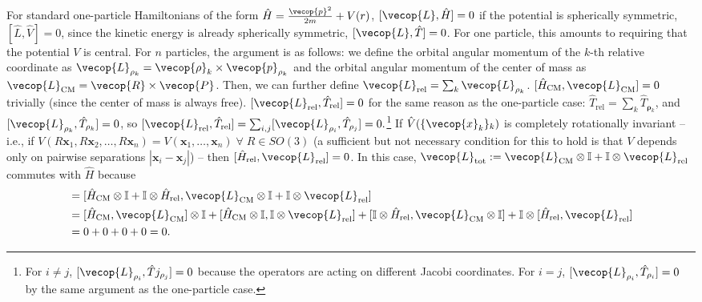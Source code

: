  For standard one-particle Hamiltonians of the form $\hat{H}=\frac{\vecop{p}^2}{2m} + V(r)$, $[\vecop{L}, \hat{H}]=0$ if the potential is spherically symmetric, $[\hat{L},\hat{V}]=0$, since the kinetic energy is already spherically symmetric, $[\vecop{L}, \hat{T}]=0$. For one particle, this amounts to requiring that the potential $V$ is central. For $n$ particles, the argument is as follows: we define the orbital angular momentum of the $k$-th relative coordinate as $\vecop{L}_{\mathbf{\rho}_k} = \vecop{\rho}_k\times \vecop{p}_{\mathbf{\rho}_k}$ and the orbital angular momentum of the center of mass as $\vecop{L}_{\text{CM}} = \vecop{R} \times \vecop{P}$. Then, we can further define $\vecop{L}_{\text{rel}}=\sum_k \vecop{L}_{\mathbf{\rho}_k}$. $[\hat{H}_{\text{CM}},\vecop{L}_{\text{CM}}]=0$ trivially (since the center of mass is always free). $[\vecop{L}_\text{rel},\hat{T}_\text{rel}]=0$ for the same reason as the one-particle case: $\hat{T}_\text{rel}=\sum_k \hat{T}_{\mathbf{\rho}_k}$, and $[\vecop{L}_{\mathbf{\rho}_k},\hat{T}_{\mathbf{\rho}_k}]=0$, so $[\vecop{L}_{\text{rel}}, \hat{T}_{\text{rel}}]=\sum_{i,j}[\vecop{L}_{\mathbf{\rho}_i},\hat{T}_{\mathbf{\rho}_j}]=0.$\footnote{
For $i\ne j$, $[\vecop{L}_{\mathbf{\rho}_i}, \hat{T}j_{\mathbf{\rho}_j}]=0$ because the operators are acting on different Jacobi coordinates. For $i=j$, $[\vecop{L}_{\mathbf{\rho}_i},\hat{T}_{\mathbf{\rho}_i}]=0$ by the same argument as the one-particle case.
}
If $\hat{V}(\{\vecop{x}_k\}_k)$ is completely rotationally invariant -- i.e., if $V(R\mathbf{x}_1, R\mathbf{x}_2, \dots, R\mathbf{x}_n)=V(\mathbf{x}_1, \dots, \mathbf{x}_n)\;\forall\; R\in SO(3)$ (a sufficient but not necessary condition for this to hold is that $V$ depends only on pairwise separations $|\mathbf{x}_i-\mathbf{x}_j|$) -- then $[\hat{H}_{\text{rel}},\vecop{L}_{\text{rel}}]=0$. In this case, $\vecop{L}_{\text{tot}}:=\vecop{L}_{\text{CM}}\otimes \mathbb{I}+\mathbb{I}\otimes\vecop{L}_{\text{rel}}$ commutes with $\hat{H}$ because
\begin{align*}
    [\hat{H}, \vecop{L}_\text{tot}] &= [\hat{H}_{\text{CM}}\otimes \mathbb{I}+\mathbb{I}\otimes \hat{H}_{\text{rel}}, \vecop{L}_{\text{CM}}\otimes\mathbb{I} + \mathbb{I}\otimes \vecop{L}_{\text{rel}}]\\
    &= [\hat{H}_{\text{CM}}, \vecop{L}_{\text{CM}}] \otimes \mathbb{I} + [\hat{H}_\text{CM}\otimes \mathbb{I}, \mathbb{I}\otimes \vecop{L}_\text{rel}]+[\mathbb{I}\otimes \hat{H}_\text{rel}, \vecop{L}_\text{CM}\otimes \mathbb{I}] + \mathbb{I}\otimes[\hat{H}_{\text{rel}},\vecop{L}_\text{rel}]\\
    &= 0 + 0 + 0 + 0 = 0.
\end{align*}
